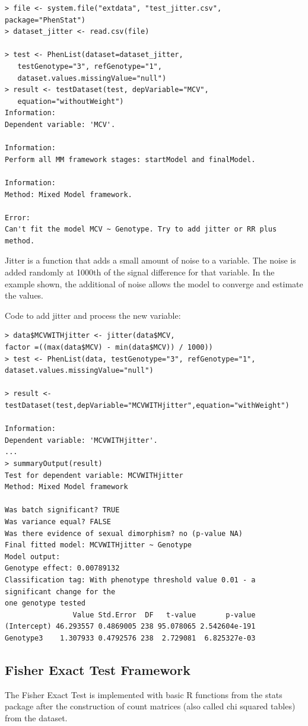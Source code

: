 \documentclass[12pt,a4paper]{article}
\begin{document}
\begingroup
    \fontsize{8pt}{12pt}\selectfont
\begin{verbatim}
> file <- system.file("extdata", "test_jitter.csv", package="PhenStat") 
> dataset_jitter <- read.csv(file)

> test <- PhenList(dataset=dataset_jitter, 
   testGenotype="3", refGenotype="1",
   dataset.values.missingValue="null")
> result <- testDataset(test, depVariable="MCV", 
   equation="withoutWeight")
Information:
Dependent variable: 'MCV'.

Information:
Perform all MM framework stages: startModel and finalModel.

Information:
Method: Mixed Model framework.

Error:
Can't fit the model MCV ~ Genotype. Try to add jitter or RR plus method.
\end{verbatim}
\endgroup

Jitter is a function that adds a small amount of noise to a variable.  The noise is added randomly at 1000th of the signal difference for that variable.  In the example shown, the additional of noise allows the model to converge and estimate the values.
  
Code to add jitter and process the new variable:


\begingroup
    \fontsize{8pt}{12pt}\selectfont
\begin{verbatim}
> data$MCVWITHjitter <- jitter(data$MCV, 
factor =((max(data$MCV) - min(data$MCV)) / 1000))
> test <- PhenList(data, testGenotype="3", refGenotype="1", 
dataset.values.missingValue="null")

> result <- testDataset(test,depVariable="MCVWITHjitter",equation="withWeight")

Information:
Dependent variable: 'MCVWITHjitter'.
...
> summaryOutput(result)
Test for dependent variable: MCVWITHjitter
Method: Mixed Model framework

Was batch significant? TRUE
Was variance equal? FALSE
Was there evidence of sexual dimorphism? no (p-value NA)
Final fitted model: MCVWITHjitter ~ Genotype
Model output:
Genotype effect: 0.00789132
Classification tag: With phenotype threshold value 0.01 - a significant change for the 
one genotype tested
                Value Std.Error  DF   t-value       p-value
(Intercept) 46.293557 0.4869005 238 95.078065 2.542604e-191
Genotype3    1.307933 0.4792576 238  2.729081  6.825327e-03
\end{verbatim}
\endgroup

 
\subsection{Fisher Exact Test Framework}
\label{section:FET}
The Fisher Exact Test is implemented with basic R functions from the stats package after the construction of count matrices (also called chi squared tables) from the dataset. 
\end{document}

